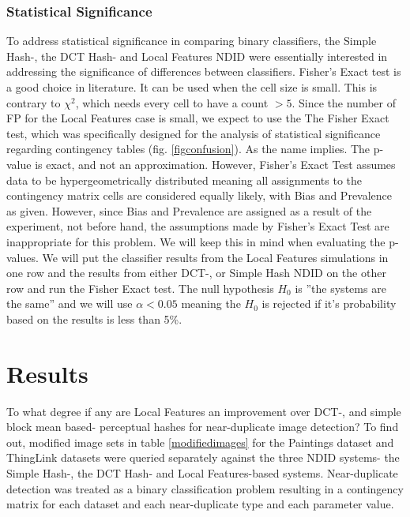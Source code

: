 \documentclass[english,12pt,a4paper,pdftex,elec,utf8, table]{aaltothesis}
\begin{document}
\subsubsection{Statistical Significance}
To address statistical significance in comparing binary classifiers, the Simple Hash-, the DCT Hash- and Local Features NDID were essentially interested in addressing the significance of differences between classifiers. Fisher's Exact test is a good choice in literature. It can be used when the cell size is small. This is contrary to $\chi^2$, which needs every cell to have a count $>5$. Since the number of FP for the Local Features case is small, we expect to use the The Fisher Exact test, which was specifically designed for the analysis of statistical significance regarding contingency tables (fig. \ref{figconfusion}). As the name implies. The p-value is exact, and not an approximation. \cite{fisher1922interpretation}
However, Fisher's Exact Test assumes data to be hypergeometrically distributed meaning all assignments to the contingency matrix cells are considered equally likely, with Bias and Prevalence as given. However, since Bias and Prevalence are assigned as a result of the experiment, not before hand, the assumptions made by Fisher's Exact Test are inappropriate for this problem. We will keep this in mind when evaluating the p-values.
We will put the classifier results from the Local Features simulations in one row and the results from either DCT-, or Simple Hash NDID on the other row and run the Fisher Exact test. The null hypothesis $H_0$ is ''the systems are the same'' and we will use $\alpha < 0.05$ meaning the $H_0$ is rejected if it's probability based on the results is less than 5\%.

\clearpage

\section{Results}\label{results}
To what degree if any are Local Features an improvement over DCT-, and simple block mean based- perceptual hashes for near-duplicate image detection? To find out, modified image sets in table \ref{modifiedimages} for the Paintings dataset and ThingLink datasets were queried separately against the three NDID systems- the Simple Hash-, the DCT Hash- and Local Features-based systems. Near-duplicate detection was treated as a binary classification problem resulting in a contingency matrix for each dataset and each near-duplicate type and each parameter value.
\end{document}
